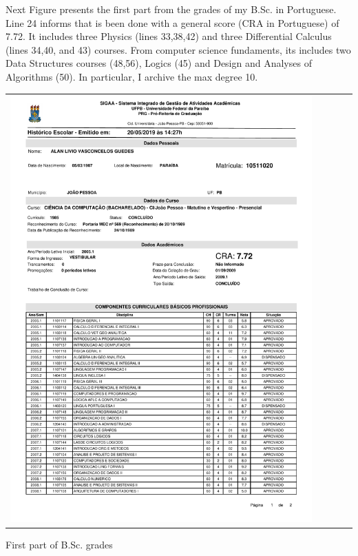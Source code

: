 \documentclass[10pt,a4paper,sans,colorlinks]{moderncv}
\begin{document}
Next Figure presents the first part from the grades of my B.Sc. in Portuguese.
Line 24 informs that is been done with a general score (CRA in Portuguese) of 7.72.
It includes three Physics (lines 33,38,42) and three Differential Calculus (lines 34,40, and 43) courses.
From computer science fundaments, its includes two Data Structures courses (48,56), Logics (45) and  Design and Analyses of Algorithms (50).
In particular, I archive the max degree 10.
\vspace{2em}
\begin{Figure}
  \begin{tabularx}{\textwidth}{X p{1cm}}
    \includegraphics[align=t,width=0.92\textwidth, keepaspectratio, trim=0cm 0cm 0cm 2cm]{certificates/bsc-grades.pdf}
  \end{tabularx}
  \caption{First part of B.Sc. grades}
\end{Figure}

\newpage
\end{document}
